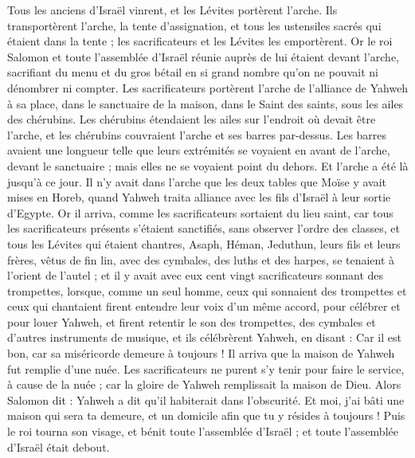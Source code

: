 \begin{multicols}{2}
Tous les anciens d'Israël vinrent, et les Lévites portèrent l'arche.
Ils transportèrent l'arche, la tente d'assignation, et tous les ustensiles sacrés qui étaient dans la tente ; les sacrificateurs et les Lévites les emportèrent.
Or le roi Salomon et toute l'assemblée d'Israël réunie auprès de lui étaient devant l'arche, sacrifiant du menu et du gros bétail en si grand nombre qu'on ne pouvait ni dénombrer ni compter.
Les sacrificateurs portèrent l'arche de l'alliance de Yahweh à sa place, dans le sanctuaire de la maison, dans le Saint des saints, sous les ailes des chérubins.
Les chérubins étendaient les ailes sur l'endroit où devait être l'arche, et les chérubins couvraient l'arche et ses barres par-dessus.
Les barres avaient une longueur telle que leurs extrémités se voyaient en avant de l'arche, devant le sanctuaire ; mais elles ne se voyaient point du dehors. Et l'arche a été là jusqu'à ce jour.
Il n'y avait dans l'arche que les deux tables que Moïse y avait mises en Horeb, quand Yahweh traita alliance avec les fils d'Israël à leur sortie d'Egypte.
Or il arriva, comme les sacrificateurs sortaient du lieu saint, car tous les sacrificateurs présents s'étaient sanctifiés, sans observer l'ordre des classes,
et tous les Lévites qui étaient chantres, Asaph, Héman, Jeduthun, leurs fils et leurs frères, vêtus de fin lin, avec des cymbales, des luths et des harpes, se tenaient à l'orient de l'autel ; et il y avait avec eux cent vingt sacrificateurs sonnant des trompettes,
lorsque, comme un seul homme, ceux qui sonnaient des trompettes et ceux qui chantaient firent entendre leur voix d'un même accord, pour célébrer et pour louer Yahweh, et firent retentir le son des trompettes, des cymbales et d'autres instruments de musique, et ils célébrèrent Yahweh, en disant : Car il est bon, car sa miséricorde demeure à toujours ! Il arriva que la maison de Yahweh fut remplie d'une nuée.
Les sacrificateurs ne purent s'y tenir pour faire le service, à cause de la nuée ; car la gloire de Yahweh remplissait la maison de Dieu.
\VerseOne{}Alors Salomon dit : Yahweh a dit qu'il habiterait dans l'obscurité.
Et moi, j'ai bâti une maison qui sera ta demeure, et un domicile afin que tu y résides à toujours !
Puis le roi tourna son visage, et bénit toute l'assemblée d'Israël ; et toute l'assemblée d'Israël était debout.

\end{multicols}
